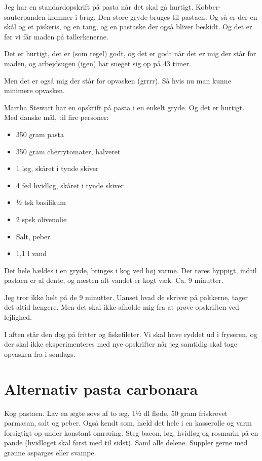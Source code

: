 \documentclass[
]{book}
\providecommand{\tightlist}{%
  \setlength{\itemsep}{0pt}\setlength{\parskip}{0pt}}
\begin{document}
Jeg har en standardopskrift på pasta når det skal gå hurtigt. Kobber-sauterpanden kommer i brug. Den store gryde bruges til pastaen. Og så er der en skål og et piskeris, og en tang, og en pastaske der også bliver beskidt. Og det er før vi får maden på tallerkenerne.

Det er hurtigt, det er (som regel) godt, og det er godt når det er mig der står for maden, og arbejdsugen (igen) har sneget sig op på 43 timer.

Men det er også mig der står for opvasken (grrrr). Så hvis nu man kunne minimere opvasken.

Martha Stewart har en opskrift på pasta i en enkelt gryde. Og det er hurtigt. Med danske mål, til fire personer:

\begin{itemize}
\tightlist
\item
  350 gram pasta
\item
  350 gram cherrytomater, halveret
\item
  1 løg, skåret i tynde skiver
\item
  4 fed hvidløg, skåret i tynde skiver
\item
  ½ tsk basilikum
\item
  2 spsk olivenolie
\item
  Salt, peber
\item
  1,1 l vand
\end{itemize}

Det hele hældes i en gryde, bringes i kog ved høj varme. Der røres hyppigt, indtil pastaen er al dente, og næsten alt vandet er kogt væk. Ca. 9 minutter.

Jeg tror ikke helt på de 9 minutter. Uanset hvad de skriver på pakkerne, tager det altid længere. Men det skal ikke afholde mig fra at prøve opskriften ved lejlighed.

I aften står den dog på fritter og fiskefileter. Vi skal have ryddet ud i fryseren, og der skal ikke eksperimenteres med nye opskrifter når jeg samtidig skal tage opvasken fra i søndags.

\hypertarget{alternativ-pasta-carbonara}{%
\section{Alternativ pasta carbonara}\label{alternativ-pasta-carbonara}}

Kog pastaen.
Lav en ægte sovs af to æg, 1½ dl fløde, 50 gram friskrevet parmasan, salt og peber. Også kendt som, hæld det hele i en kasserolle og varm forsigtigt op under konstant omrøring.
Steg bacon, løg, hvidløg og rosmarin på en pande (hvidløget skal først med til sidst).
Saml alle delene.
Suppler gerne med grønne asparges eller svampe.
\end{document}
